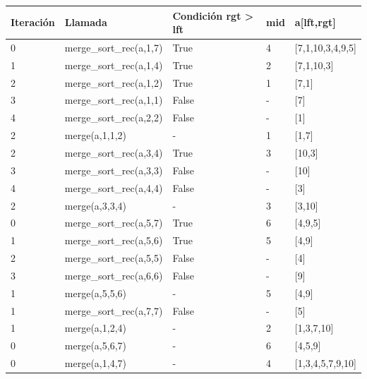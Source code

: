 \begin{tabularx}{\textwidth}{|p{2cm}|X|X|p{2cm}|X|}
    \hline
    \textbf{Iteración} & \textbf{Llamada} & \textbf{Condición rgt > lft} & \textbf{mid} & \textbf{a[lft,rgt]} \\
    \hline
    0 & merge\_sort\_rec(a,1,7) & True & 4 & [7,1,10,3,4,9,5] \\
    1 & merge\_sort\_rec(a,1,4) & True & 2 & [7,1,10,3] \\
    2 & merge\_sort\_rec(a,1,2) & True & 1 & [7,1] \\
    3 & merge\_sort\_rec(a,1,1) & False & - & [7] \\
    4 & merge\_sort\_rec(a,2,2) & False & - & [1] \\
    \hline
    2 & merge(a,1,1,2) & - & 1 & [1,7] \\
    \hline
    2 & merge\_sort\_rec(a,3,4) & True & 3 & [10,3] \\
    3 & merge\_sort\_rec(a,3,3) & False & - & [10] \\
    4 & merge\_sort\_rec(a,4,4) & False & - & [3] \\
    \hline
    2 & merge(a,3,3,4) & - & 3 & [3,10] \\
    \hline
    0 & merge\_sort\_rec(a,5,7) & True & 6 & [4,9,5] \\
    1 & merge\_sort\_rec(a,5,6) & True & 5 & [4,9] \\
    2 & merge\_sort\_rec(a,5,5) & False & - & [4] \\
    3 & merge\_sort\_rec(a,6,6) & False & - & [9] \\
    \hline
    1 & merge(a,5,5,6) & - & 5 & [4,9] \\
    \hline
    1 & merge\_sort\_rec(a,7,7) & False & - & [5] \\
    \hline
    1 & merge(a,1,2,4) & - & 2 & [1,3,7,10] \\
    \hline
    0 & merge(a,5,6,7) & - & 6 & [4,5,9] \\
    \hline
    0 & merge(a,1,4,7) & - & 4 & [1,3,4,5,7,9,10] \\
    \hline
\end{tabularx}


